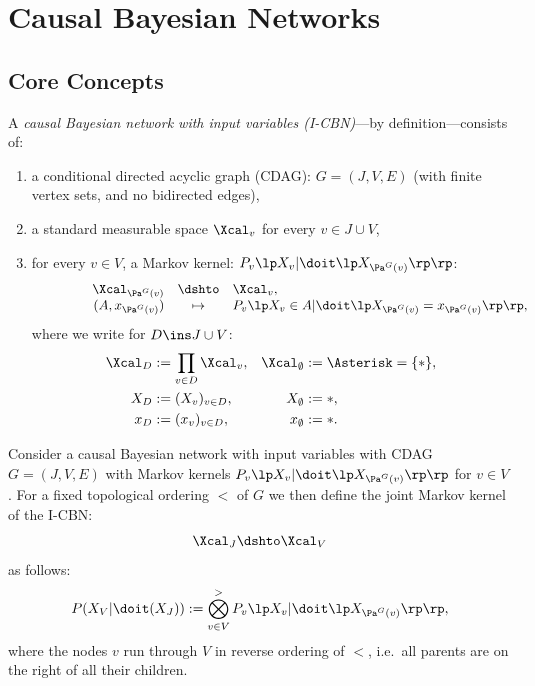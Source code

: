 \section{Causal Bayesian Networks}

\subsection{Core Concepts}

\begin{Def}
    \label{def-I-CBN}
    A \emph{causal Bayesian network with input variables (I-CBN)}---by definition---consists of:
    \begin{enumerate}[label=\alph*)]
        \item a conditional directed acyclic graph (CDAG): $G = (J,V,E)$ (with finite vertex sets, and no bidirected edges),
        \item a standard measurable space $\Xcal_v$ for every $v \in J \cup V$,
        \item for every $v \in V$, a Markov kernel: $\displaystyle  P_v\lp X_v|\doit\lp X_{\Pa^G(v)}\rp\rp$:
        \[\begin{array}{ccrcl}
           & & \Xcal_{\Pa^G(v)} & \dshto & \Xcal_v, \\
           && \qquad (A,x_{\Pa^G(v)}) & \mapsto &  P_v\lp X_v \in A|\doit\lp X_{\Pa^G(v)} = x_{\Pa^G(v)} \rp\rp,
        \end{array}\]
        where we write for $D \ins J \cup V$:
               \begin{align*} 
                   \Xcal_D &:= \prod_{v \in D} \Xcal_v,&
                   \Xcal_\emptyset &:= \Asterisk = \{\ast\},\\
                   X_D &:= (X_v)_{v \in D},&
                   X_\emptyset &:= \ast,\\
                   x_D &:= (x_v)_{v \in D},&
                   x_\emptyset &:= \ast.
              \end{align*}
    \end{enumerate}
\end{Def}

\begin{Def}
    Consider a causal Bayesian network with input variables with CDAG $G=(J,V,E)$ with Markov kernels
    $P_v\lp X_v|\doit\lp X_{\Pa^G(v)}\rp\rp$ for $v \in V$.
    For a fixed topological ordering $<$ of $G$ 
    we  then define the joint Markov kernel of the I-CBN:
    \[ \Xcal_J \dshto \Xcal_V\]
    as follows:
    \[  P(X_V|\doit(X_J)) := \bigotimes_{v \in V}^> P_v\lp X_v|\doit\lp X_{\Pa^G(v)}\rp\rp,  \]
    where the nodes $v$ run through $V$ in reverse ordering of $<$, i.e.\ 
    all parents are on the right of all their children.
\end{Def}

